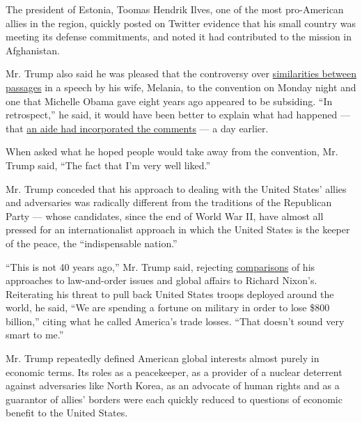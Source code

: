 The president of Estonia, Toomas Hendrik Ilves, one of the most
pro-American allies in the region, quickly posted on Twitter evidence
that his small country was meeting its defense commitments, and noted it
had contributed to the mission in Afghanistan.

Mr. Trump also said he was pleased that the controversy over
\href{https://www.google.com/url?sa=t\&rct=j\&q=\&esrc=s\&source=web\&cd=9\&cad=rja\&uact=8\&ved=0ahUKEwjwj8XHoYPOAhWIKiYKHfotB60QFgg5MAg\&url=http\%3A\%2F\%2Fwww.nytimes.com\%2F2016\%2F07\%2F20\%2Fus\%2Fpolitics\%2Fmelania-trump-convention-speech.html\&usg=AFQjCNG78WkWxO0yF05A0NlaEtc_JcvJ4g\&sig2=bSNM6FRcYkcX9fq9Zwfkiw\&bvm=bv.127521224,d.eWE}{similarities
between passages} in a speech by his wife, Melania, to the convention on
Monday night and one that Michelle Obama gave eight years ago appeared
to be subsiding. ``In retrospect,'' he said, it would have been better
to explain what had happened --- that
\href{https://www.nytimes.com/2016/07/21/us/politics/melania-trump-speech-meredith-mciver.html}{an
aide had incorporated the comments} --- a day earlier.

When asked what he hoped people would take away from the convention, Mr.
Trump said, ``The fact that I'm very well liked.''

Mr. Trump conceded that his approach to dealing with the United States'
allies and adversaries was radically different from the traditions of
the Republican Party --- whose candidates, since the end of World War
II, have almost all pressed for an internationalist approach in which
the United States is the keeper of the peace, the ``indispensable
nation.''

``This is not 40 years ago,'' Mr. Trump said, rejecting
\href{https://www.nytimes.com/2016/07/19/us/politics/donald-trump-portrayed-as-an-heir-to-richard-nixon.html}{comparisons}
of his approaches to law-and-order issues and global affairs to Richard
Nixon's. Reiterating his threat to pull back United States troops
deployed around the world, he said, ``We are spending a fortune on
military in order to lose \$800 billion,'' citing what he called
America's trade losses. ``That doesn't sound very smart to me.''

Mr. Trump repeatedly defined American global interests almost purely in
economic terms. Its roles as a peacekeeper, as a provider of a nuclear
deterrent against adversaries like North Korea, as an advocate of human
rights and as a guarantor of allies' borders were each quickly reduced
to questions of economic benefit to the United States.

